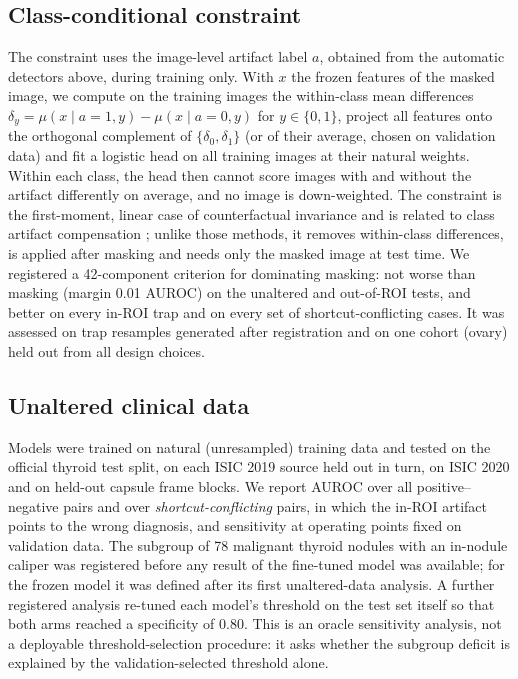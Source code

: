 \documentclass[12pt]{article}
\begin{document}
\subsection*{Class-conditional constraint}
The constraint uses the image-level artifact label $a$, obtained from the automatic detectors above, during training
only. With $x$ the frozen features of the masked image, we compute on the training images the within-class mean
differences $\delta_y=\mu(x\mid a{=}1,y)-\mu(x\mid a{=}0,y)$ for $y\in\{0,1\}$, project all features onto the orthogonal
complement of $\{\delta_0,\delta_1\}$ (or of their average, chosen on validation data) and fit a logistic head on all
training images at their natural weights. Within each class, the head then cannot score images with and without the
artifact differently on average, and no image is down-weighted. The constraint is the first-moment, linear case of
counterfactual invariance \cite{veitch2021counterfactual,makar2022causally} and is related to class artifact compensation
\cite{anders2022clever,pahde2025ensuring}; unlike those methods, it removes within-class differences, is applied after
masking and needs only the masked image at test time. We registered a 42-component criterion for dominating masking:
not worse than masking (margin 0.01 AUROC) on the unaltered and out-of-ROI tests, and better on every in-ROI trap and
on every set of shortcut-conflicting cases. It was assessed on trap resamples generated after registration and on one
cohort (ovary) held out from all design choices.

\subsection*{Unaltered clinical data}
Models were trained on natural (unresampled) training data and tested on the official thyroid test split, on each
ISIC 2019 source held out in turn, on ISIC 2020 and on held-out capsule frame blocks. We report AUROC over all
positive--negative pairs and over \emph{shortcut-conflicting} pairs, in which the in-ROI artifact points to the wrong
diagnosis, and sensitivity at operating points fixed on validation data. The subgroup of 78 malignant thyroid nodules
with an in-nodule caliper was registered before any result of the fine-tuned model was available; for the frozen model it
was defined after its first unaltered-data analysis. A further registered analysis re-tuned each model's threshold on the
test set itself so that both arms reached a specificity of 0.80. This is an oracle sensitivity analysis, not a
deployable threshold-selection procedure: it asks whether the subgroup deficit is explained by the validation-selected
threshold alone.
\end{document}
